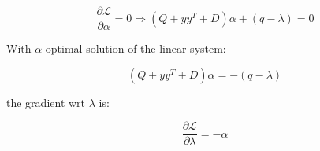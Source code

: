 \begin{equation} \label{eq:l2_svc_lb_lagrangian_der_a}
	\frac{\partial \mathcal{L}}{\partial \alpha}=0\Rightarrow (Q + yy^T + D) \alpha + (q - \lambda) = 0
\end{equation}

With $\alpha$ optimal solution of the linear system:

\begin{equation} \label{eq:l2_svc_lb_lagrangian_sol}
    (Q + yy^T + D) \alpha = - (q - \lambda)
\end{equation}

the gradient wrt $\lambda$ is:

\begin{equation} \label{eq:l2_svc_lb_lagrangian_der_l}
    \frac{\partial \mathcal{L}}{\partial \lambda}=-\alpha
\end{equation}